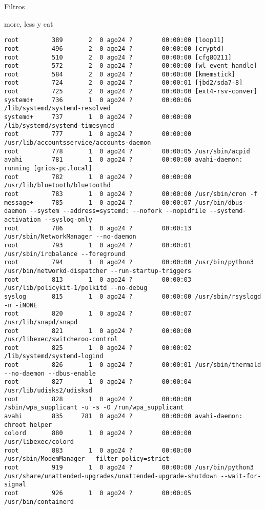 \begin{section}{Filtros}
\begin{subsection}{more, less y cat}
\begin{lstlisting}[style=Ubuntu]
root         389       2  0 ago24 ?        00:00:00 [loop11]
root         496       2  0 ago24 ?        00:00:00 [cryptd]
root         510       2  0 ago24 ?        00:00:00 [cfg80211]
root         572       2  0 ago24 ?        00:00:00 [wl_event_handle]
root         584       2  0 ago24 ?        00:00:00 [kmemstick]
root         724       2  0 ago24 ?        00:00:01 [jbd2/sda7-8]
root         725       2  0 ago24 ?        00:00:00 [ext4-rsv-conver]
systemd+     736       1  0 ago24 ?        00:00:06 /lib/systemd/systemd-resolved
systemd+     737       1  0 ago24 ?        00:00:00 /lib/systemd/systemd-timesyncd
root         777       1  0 ago24 ?        00:00:00 /usr/lib/accountsservice/accounts-daemon
root         778       1  0 ago24 ?        00:00:05 /usr/sbin/acpid
avahi        781       1  0 ago24 ?        00:00:00 avahi-daemon: running [grios-pc.local]
root         782       1  0 ago24 ?        00:00:00 /usr/lib/bluetooth/bluetoothd
root         783       1  0 ago24 ?        00:00:00 /usr/sbin/cron -f
message+     785       1  0 ago24 ?        00:00:07 /usr/bin/dbus-daemon --system --address=systemd: --nofork --nopidfile --systemd-activation --syslog-only
root         786       1  0 ago24 ?        00:00:13 /usr/sbin/NetworkManager --no-daemon
root         793       1  0 ago24 ?        00:00:01 /usr/sbin/irqbalance --foreground
root         794       1  0 ago24 ?        00:00:00 /usr/bin/python3 /usr/bin/networkd-dispatcher --run-startup-triggers
root         813       1  0 ago24 ?        00:00:03 /usr/lib/policykit-1/polkitd --no-debug
syslog       815       1  0 ago24 ?        00:00:00 /usr/sbin/rsyslogd -n -iNONE
root         820       1  0 ago24 ?        00:00:07 /usr/lib/snapd/snapd
root         821       1  0 ago24 ?        00:00:00 /usr/libexec/switcheroo-control
root         825       1  0 ago24 ?        00:00:02 /lib/systemd/systemd-logind
root         826       1  0 ago24 ?        00:00:01 /usr/sbin/thermald --no-daemon --dbus-enable
root         827       1  0 ago24 ?        00:00:04 /usr/lib/udisks2/udisksd
root         828       1  0 ago24 ?        00:00:00 /sbin/wpa_supplicant -u -s -O /run/wpa_supplicant
avahi        835     781  0 ago24 ?        00:00:00 avahi-daemon: chroot helper
colord       880       1  0 ago24 ?        00:00:00 /usr/libexec/colord
root         883       1  0 ago24 ?        00:00:00 /usr/sbin/ModemManager --filter-policy=strict
root         919       1  0 ago24 ?        00:00:00 /usr/bin/python3 /usr/share/unattended-upgrades/unattended-upgrade-shutdown --wait-for-signal
root         926       1  0 ago24 ?        00:00:05 /usr/bin/containerd

\end{lstlisting}
\end{subsection}
\end{section}
